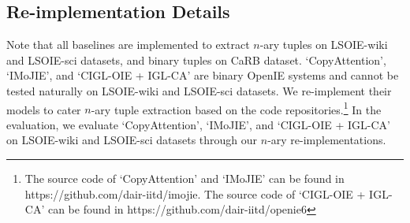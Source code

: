 \documentclass[11pt]{article}
\begin{document}
\subsection{Re-implementation Details}
\label{sec:reimplementation}
Note that all baselines are implemented to extract $n$-ary tuples on LSOIE-wiki and LSOIE-sci datasets, and binary tuples on CaRB dataset. `CopyAttention', `IMoJIE', and `CIGL-OIE + IGL-CA' are binary OpenIE systems and cannot be tested naturally on LSOIE-wiki and LSOIE-sci datasets. We re-implement their models to cater $n$-ary tuple extraction based on the code repositories.\footnote{The source code of `CopyAttention' and `IMoJIE' can be found in https://github.com/dair-iitd/imojie. The source code of `CIGL-OIE + IGL-CA' can be found in https://github.com/dair-iitd/openie6}
In the evaluation, we evaluate `CopyAttention', `IMoJIE', and `CIGL-OIE + IGL-CA' on LSOIE-wiki and LSOIE-sci datasets through our $n$-ary re-implementations.











 
\end{document}
